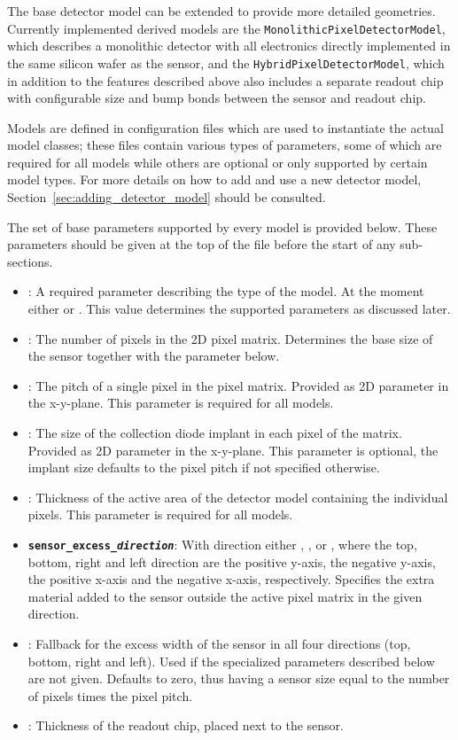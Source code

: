 The base detector model can be extended to provide more detailed geometries.
Currently implemented derived models are the \texttt{MonolithicPixelDetectorModel}, which describes a monolithic detector with all electronics directly implemented in the same silicon wafer as the sensor, and the \texttt{HybridPixelDetectorModel}, which in addition to the features described above also includes a separate readout chip with configurable size and bump bonds between the sensor and readout chip.

Models are defined in configuration files which are used to instantiate the actual model classes; these files contain various types of parameters, some of which are required for all models while others are optional or only supported by certain model types.
For more details on how to add and use a new detector model, Section~\ref{sec:adding_detector_model} should be consulted.

The set of base parameters supported by every model is provided below.
These parameters should be given at the top of the file before the start of any sub-sections.
\begin{itemize}
\item {}: A required parameter describing the type of the model.
At the moment either  or .
This value determines the supported parameters as discussed later.
\item {}: The number of pixels in the 2D pixel matrix.
Determines the base size of the sensor together with the  parameter below.
\item {}: The pitch of a single pixel in the pixel matrix.
Provided as 2D parameter in the x-y-plane.
This parameter is required for all models.
\item {}: The size of the collection diode implant in each pixel of the matrix.
Provided as 2D parameter in the x-y-plane.
This parameter is optional, the implant size defaults to the pixel pitch if not specified otherwise.
\item {}: Thickness of the active area of the detector model containing the individual pixels.
This parameter is required for all models.
\item \texttt{\textbf{sensor\_excess\_\textit{direction}}}: With direction either , ,  or , where the top, bottom, right and left direction are the positive y-axis, the negative y-axis, the positive x-axis and the negative x-axis, respectively.
Specifies the extra material added to the sensor outside the active pixel matrix in the given direction.
\item {}: Fallback for the excess width of the sensor in all four directions (top, bottom, right and left).
Used if the specialized parameters described below are not given.
Defaults to zero, thus having a sensor size equal to the number of pixels times the pixel pitch.
\item {}: Thickness of the readout chip, placed next to the sensor.
\end{itemize}

